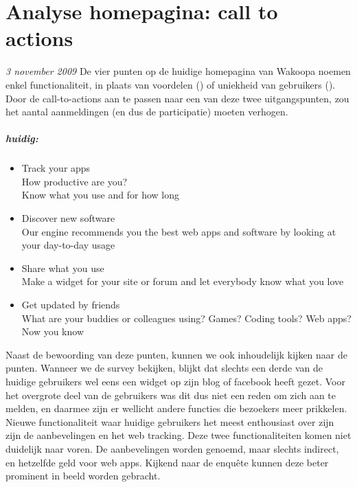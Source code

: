 \chapter{Analyse homepagina: call to actions}
\label{analysehomeappendix}
\textit{3 november 2009} De vier punten op de huidige homepagina van Wakoopa noemen enkel functionaliteit, in plaats van voordelen (\citet{Hoekman2008}) of uniekheid van gebruikers (\citet{Beenen2004}). Door de call-to-actions aan te passen naar een van deze twee uitgangspunten, zou het aantal aanmeldingen (en dus de participatie) moeten verhogen.

\paragraph{huidig:}
\begin{itemize}
    \item{Track your apps\\
      How productive are you?\\
      Know what you use and for how long}

    \item{Discover new software\\
      Our engine recommends you the best web apps and software by looking at your day-to-day usage}

    \item{Share what you use\\
      Make a widget for your site or forum and let everybody know what you love}

    \item{Get updated by friends\\
      What are your buddies or colleagues using? Games? Coding tools? Web apps? Now you know}
\end{itemize}

Naast de bewoording van deze punten, kunnen we ook inhoudelijk kijken naar de punten. Wanneer we de survey bekijken, blijkt dat slechts een derde van de huidige gebruikers wel eens een widget op zijn blog of facebook heeft gezet. Voor het overgrote deel van de gebruikers was dit dus niet een reden om zich aan te melden, en daarmee zijn er wellicht andere functies die bezoekers meer prikkelen. Nieuwe functionaliteit waar huidige gebruikers het meest enthousiast over zijn zijn de aanbevelingen en het web tracking. Deze twee functionaliteiten komen niet duidelijk naar voren. De aanbevelingen worden genoemd, maar slechts indirect, en hetzelfde geld voor web apps. Kijkend naar de enqu\^ete kunnen deze beter prominent in beeld worden gebracht.

